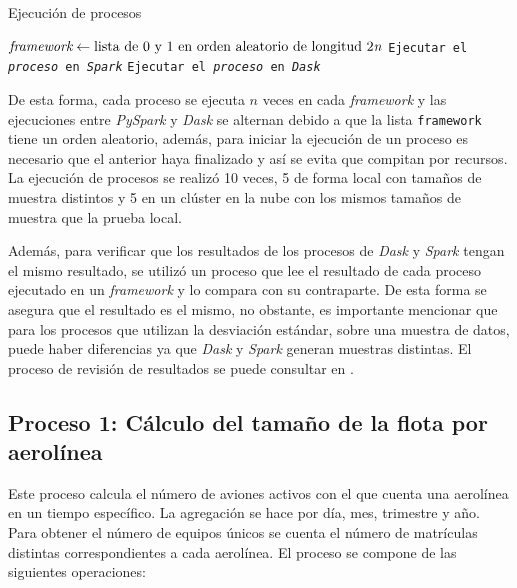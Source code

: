\begin{algorithm}[H]
\caption{Ejecución de procesos}\label{ejecucion_procesos}
\begin{algorithmic}[1]
	\State $\textit{framework} \gets \text{lista de 0 y 1 en orden aleatorio de longitud 2\textit{n}}$
		\State \texttt{Ejecutar el \textit{proceso} en \textit{Spark}}
		\Else
		\State \texttt{Ejecutar el \textit{proceso} en \textit{Dask}}
		\EndIf
	\EndFor
\EndFor
\EndProcedure
\end{algorithmic}
\end{algorithm}

De esta forma, cada proceso se ejecuta $n$ veces en cada \textit{framework} y las ejecuciones entre \textit{PySpark} y \textit{Dask} se alternan debido a que la lista \texttt{framework} tiene un orden aleatorio, además, para iniciar la ejecución de un proceso es necesario que el anterior haya finalizado y así se evita que compitan por recursos. La ejecución de procesos se realizó 10 veces, 5 de forma local con tamaños de muestra distintos y 5 en un clúster en la nube con los mismos tamaños de muestra que la prueba local.

Además, para verificar que los resultados de los procesos de \textit{Dask} y \textit{Spark} tengan el mismo resultado, se utilizó un proceso que lee el resultado de cada proceso ejecutado en un \textit{framework} y lo compara con su contraparte. De esta forma se asegura que el resultado es el mismo, no obstante, es importante mencionar que para los procesos que utilizan la desviación estándar, sobre una muestra de datos, puede haber diferencias ya que \textit{Dask} y \textit{Spark} generan muestras distintas. El proceso de revisión de resultados se puede consultar en \cite{compara-resultados}.

\subsection{Proceso 1: Cálculo del tamaño de la flota por aerolínea}

Este proceso calcula el número de aviones activos con el que cuenta una aerolínea en un tiempo específico. La agregación se hace por día, mes, trimestre y año. Para obtener el número de equipos únicos se cuenta el número de matrículas distintas correspondientes a cada aerolínea. El proceso se compone de las siguientes operaciones:

